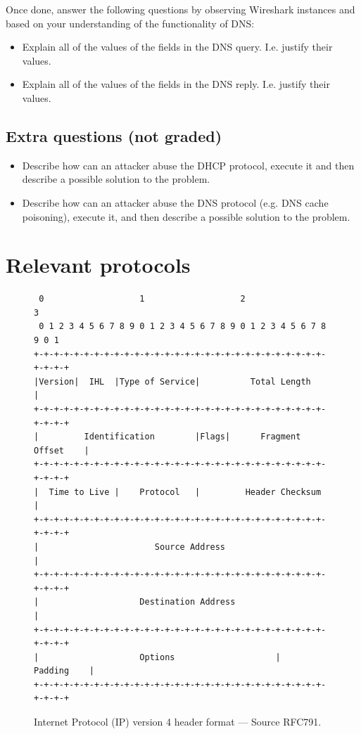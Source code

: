\documentclass[pdftex,12pt,a4paper]{article}
\begin{document}
            Once done, answer the following questions by observing Wireshark
            instances and based on your understanding of the functionality of
            DNS:
            \begin{itemize}
                \item Explain all of the values of the fields in the DNS query.
                    I.e. justify their values.
                \item Explain all of the values of the fields in the DNS reply.
                    I.e. justify their values.
            \end{itemize}


        \subsection{Extra questions (not graded)}
            \begin{itemize}
                \item Describe how can an attacker abuse the DHCP protocol,
                    execute it and then describe a possible solution to the
                    problem.
                \item Describe how can an attacker abuse the DNS protocol
                    (e.g. DNS cache poisoning), execute it, and then describe a
                    possible solution to the problem.
            \end{itemize}

    \appendix
    \section{Relevant protocols}
                \begin{figure}[tbh]
                    \centering
                    \begin{verbatim} 0                   1                   2                   3
 0 1 2 3 4 5 6 7 8 9 0 1 2 3 4 5 6 7 8 9 0 1 2 3 4 5 6 7 8 9 0 1
+-+-+-+-+-+-+-+-+-+-+-+-+-+-+-+-+-+-+-+-+-+-+-+-+-+-+-+-+-+-+-+-+
|Version|  IHL  |Type of Service|          Total Length         |
+-+-+-+-+-+-+-+-+-+-+-+-+-+-+-+-+-+-+-+-+-+-+-+-+-+-+-+-+-+-+-+-+
|         Identification        |Flags|      Fragment Offset    |
+-+-+-+-+-+-+-+-+-+-+-+-+-+-+-+-+-+-+-+-+-+-+-+-+-+-+-+-+-+-+-+-+
|  Time to Live |    Protocol   |         Header Checksum       |
+-+-+-+-+-+-+-+-+-+-+-+-+-+-+-+-+-+-+-+-+-+-+-+-+-+-+-+-+-+-+-+-+
|                       Source Address                          |
+-+-+-+-+-+-+-+-+-+-+-+-+-+-+-+-+-+-+-+-+-+-+-+-+-+-+-+-+-+-+-+-+
|                    Destination Address                        |
+-+-+-+-+-+-+-+-+-+-+-+-+-+-+-+-+-+-+-+-+-+-+-+-+-+-+-+-+-+-+-+-+
|                    Options                    |    Padding    |
+-+-+-+-+-+-+-+-+-+-+-+-+-+-+-+-+-+-+-+-+-+-+-+-+-+-+-+-+-+-+-+-+\end{verbatim}
                    \caption{Internet Protocol (IP) version 4 header format --- Source RFC791.}
                    \label{fig:ipv4}
                \end{figure}
\end{document}
